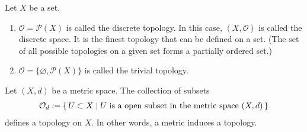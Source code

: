 %
\begin{exmbox}
    \begin{example}
        Let \(X\) be a {\color{mathif}set}.
        \begin{enumerate}
            \item \(\mathcal{O} = \mathcal{P}(X)\) is called the {\color{maththen}discrete topology}. In this case, \((X, \mathcal{O})\) is called the {\color{maththen}discrete space}. It is the {\color{mathrem}finest topology} that can be defined on a set. (The set of all possible topologies on a given set forms a partially ordered set.)
            \item \(\mathcal{O} = \{\varnothing, \mathcal{P}(X)\}\) is called the {\color{maththen}trivial topology}.
        \end{enumerate}
    \end{example}
\end{exmbox}

\begin{thmbox}
    \begin{proposition}
        Let \((X, d)\) be a metric space. The collection of subsets
        \begin{align*}
            \mathcal{O}_d := \left\{\, U \subset X \mid U \text{ is a open subset in the metric space } (X, d) \,\right\}
        \end{align*}
        defines a topology on \(X\). In other words, a metric induces a topology.
    \end{proposition}
\end{thmbox}

